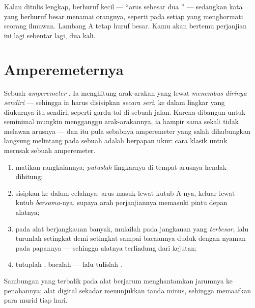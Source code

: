\begin{remark}\label{rem:g8:intensity-ammeter:person}
Kalau ditulis lengkap,  berhuruf kecil --- ``arus sebesar dua
'' --- sedangkan kata yang berhuruf besar menamai orangnya,
seperti pada setiap  yang menghormati seorang ilmuwan. Lambang
\unit{A} tetap huruf besar. Kamu akan bertemu perjanjian ini lagi
sebentar lagi, dua kali.
\end{remark}

\section{Amperemeternya}

\begin{definition}[Amperemeter]\label{def:g8:intensity-ammeter:ammeter}
Sebuah \emph{amperemeter}  . Ia
menghitung arak-arakan yang lewat \emph{menembus dirinya sendiri} ---
sehingga ia harus disisipkan \emph{secara seri}, ke dalam lingkar yang
diukurnya itu sendiri, seperti gardu tol di sebuah jalan. Karena
dibangun untuk seminimal mungkin mengganggu arak-arakannya, ia hampir
sama sekali tidak melawan arusnya --- dan itu pula sebabnya
amperemeter yang salah dihubungkan langsung melintang pada sebuah
 adalah  berpapan ukur: cara klasik untuk merusak
sebuah amperemeter.
\end{definition}

\begin{method}\label{met:g8:intensity-ammeter:measure}
\begin{enumerate}
  \item matikan rangkaiannya; \emph{putuslah} lingkarnya di tempat
        arusnya hendak dihitung;
  \item sisipkan  ke dalam celahnya: arus masuk lewat
        kutub \unit{A}-nya, keluar lewat kutub \emph{bersama}-nya,
        supaya arah perjanjiannya memasuki pintu depan alatnya;
  \item pada alat berjangkauan banyak, mulailah pada jangkauan yang
        \emph{terbesar}, lalu turunlah setingkat demi setingkat
        sampai bacaannya duduk dengan nyaman pada papannya ---
        sehingga alatnya terlindung dari kejutan;
  \item tutuplah , bacalah --- lalu tulislah .
\end{enumerate}
Sambungan yang terbalik pada alat berjarum menghantamkan jarumnya ke
penahannya; alat digital sekadar menunjukkan tanda minus, sehingga
memaafkan para murid tiap hari.
\end{method}

